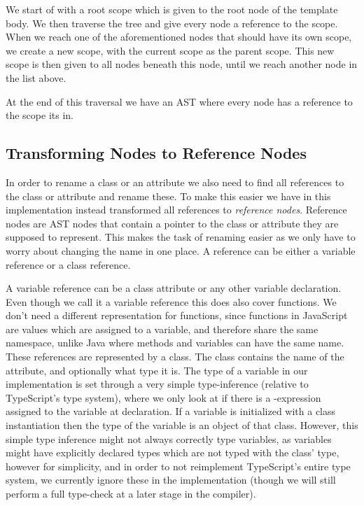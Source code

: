 We start of with a root scope which is given to the root node of the template body.
We then traverse the tree and give every node a reference to the scope.
When we reach one of the aforementioned nodes that should have its own scope, we create a new scope, with the current scope as the parent scope.
This new scope is then given to all nodes beneath this node, until we reach another node in the list above.

At the end of this traversal we have an AST where every node has a reference to the scope its in.

\subsection{Transforming Nodes to Reference Nodes}\label{subsec:transforming-nodes-to-references}


In order to rename a class or an attribute we also need to find all references to the class or attribute and rename these.
To make this easier we have in this implementation instead transformed all references to \textit{reference nodes}.
Reference nodes are AST nodes that contain a pointer to the class or attribute they are supposed to represent.
This makes the task of renaming easier as we only have to worry about changing the name in one place.
A reference can be either a variable reference or a class reference.

A variable reference can be a class attribute or any other variable declaration.
Even though we call it a variable reference this does also cover functions.
We don't need a different representation for functions, since functions in JavaScript are values which are assigned to a variable, and therefore share the same namespace, unlike Java where methods and variables can have the same name.
These references are represented by a  class.
The class contains the name of the attribute, and optionally what type it is.
The type of a variable in our implementation is set through a very simple type-inference (relative to TypeScript's type system), where we only look at if there is a -expression assigned to the variable at declaration.
If a variable is initialized with a class instantiation then the type of the variable is an object of that class.
However, this simple type inference might not always correctly type variables, as variables might have explicitly declared types which are not typed with the class' type, however for simplicity, and in order to not reimplement TypeScript's entire type system, we currently ignore these in the implementation (though we will still perform a full type-check at a later stage in the compiler).

